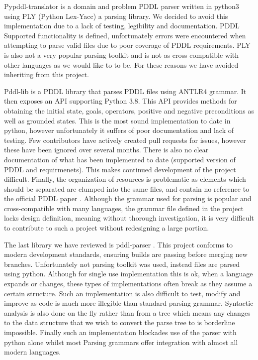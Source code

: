 Pypddl-translator \cite{ssardina20:online} is a domain and problem PDDL parser written in python3 using PLY (Python Lex-Yacc) a parsing library. We decided to avoid this implementation due to a lack of testing, legibility and documentation. PDDL Supported functionality is defined, unfortunately errors were encountered when attempting to parse valid files due to poor coverage of PDDL requirements. PLY is also not a very popular parsing toolkit and is not as cross compatible with other languages as we would like to to be. For these reasons we have avoided inheriting from this project.

Pddl-lib \cite{hfoffani23:online} is a PDDL library that parses PDDL files using ANTLR4 grammar. It then exposes an API supporting Python 3.8. This API provides methods for obtaining the initial state, goals, operators, positive and negative preconditions as well as grounded states. This is the most sound implementation to date in python, however unfortunately it suffers of poor documentation and lack of testing. Few contributors have actively created pull requests for issues, however these have been ignored over several months. There is also no clear documentation of what has been implemented to date (supported version of PDDL and requirmenets). This makes continued development of the project difficult. Finally, the organization of resources is problematic as elements which should be separated are clumped into the same files, and contain no reference to the official PDDL paper \cite{httpsarx9:online}. Although the grammar used for parsing is popular and cross-compatible with many languages, the grammar file defined in the project lacks design definition, meaning without thorough investigation, it is very difficult to contribute to such a project without redesigning a large portion.

The last library we have reviewed is pddl-parser \cite{pucrsaut37:online}. This project conforms to modern development standards, ensuring builds are passing before merging new branches. Unfortunately  not parsing toolkit was used, instead files are parsed using python. Although for single use implementation this is ok, when a language expands or changes, these types of implementations often break as they assume a certain structure. Such an implementation is also difficult to test, modify and improve as code is much more illegible than standard parsing grammar.
Syntactic analysis is also done on the fly rather than from a tree which means any changes to the data structure that we wish to convert the parse tree to is borderline impossible. Finally such an implementation blockades use of the parser with python alone whilst most Parsing grammars offer integration with almost all modern languages.

